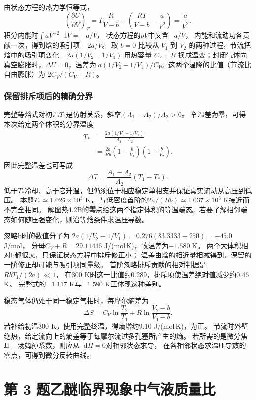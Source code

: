 \documentclass[UTF8,fontset=fandol,a4paper,11pt]{ctexart}
\newcommand{\dd}{\mathop{}\!\mathrm{d}}
\begin{document}
由状态方程的热力学恒等式，
\[
\left(\frac{\partial U}{\partial V}\right)_T
=T\frac R{V-b}-\left(\frac{RT}{V-b}-\frac a{V^2}\right)
=\frac a{V^2}.
\]
积分内能时$\int aV^{-2}\dd V=-a/V$，
状态方程的$pV$中又含$-a/V$，
内能和流动功各贡献一次，得到焓的吸引项 $-2a/V$。
取 $b=0$ 比较从 $V_1$ 到 $V_2$ 的两种过程。节流把焓中的吸引项变化 $-2a(1/V_2-1/V_1)$ 用热容量 $C_V+R$ 换成温变；封闭气体向真空膨胀时，$\Delta U=0$，温差为 $a(1/V_2-1/V_1)/C_V$。这两个温降的比值（节流比自由膨胀）为 $2C_V/(C_V+R)$。

\subsubsection*{保留排斥项后的精确分界}
完整等焓式对初温$T_1$是仿射关系，斜率$(A_1-A_2)/A_2>0$。
令温差为零，可得本次给定两个体积的分界温度
\[
\begin{aligned}
T_*&=\frac{2a(1/V_1-1/V_2)}{A_1-A_2}\\
&=\frac{2a}{Rb}
\left(1-\frac b{V_1}\right)
\left(1-\frac b{V_2}\right).
\end{aligned}
\]
因此完整温差也可写成
\[
\Delta T=\frac{A_1-A_2}{A_2}(T_1-T_*).
\]
低于$T_*$冷却、高于它升温，但仍须位于相应稳定单相支并保证真实流动从高压到低压。
本题$T_*\simeq1.026\times10^3$ K，
与低密度首阶的$2a/(Rb)\simeq1.037\times10^3$ K接近而不完全相同。
解图热4.2B的零点给这两个指定体积的等温端态。若要了解相邻端态如何随压强变化，则沿等焓条件求温压导数。

忽略b时的数值分子为
$2a(1/V_2-1/V_1)=0.276(83.3333-250)=-46.0$ J/mol，
分母$C_V+R=29.11446$ J/(mol\,K)，故温差为$-1.580$ K。
两个大体积相对b都很大，只保证状态方程中排斥修正小；
温差由焓的相近量相减得到，保留的一阶修正却可能与吸引项同量级。
首阶忽略排斥贡献的相对判据是$RbT_1/(2a)\ll1$，
在300 K时这一比值约0.289，排斥项使温差绝对值减少约0.46 K。
完整式的$-1.117$ K与$-1.580$ K正体现这种差别。

稳态气体仍处于同一稳定气相时，每摩尔熵差为
\[
\Delta S=C_V\ln\frac{T_2}{T_1}
+R\ln\frac{V_2-b}{V_1-b}.
\]
若补给初温300 K，使用完整终温，得熵增约$9.10$ J/(mol\,K)，为正。
节流时外壁绝热，给定流向上的熵差等于每摩尔流过多孔塞所产生的熵。
若所需的是微分焦耳—汤姆孙系数，则应从$\dd H=0$对相邻状态求导，
在各相邻状态求温压导数的零点，可得到微分反转曲线。




\section*{第 3 题\quad 乙醚临界现象中气液质量比}
\end{document}
